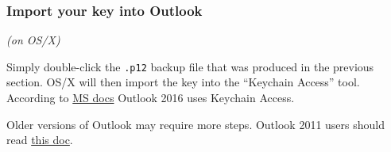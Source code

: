 \documentclass[pdftex,12pt,titlepage=false]{scrartcl}
\begin{document}
\subsubsection{Import your key into Outlook}\label{import}
\begin{minipage}[t]{0.47\textwidth}
  \centerline{\textsl{(on OS/X)}} Simply double-click the
  \texttt{.p12} backup file that was produced in the previous section.
  OS/X will then import the key into the ``Keychain Access'' tool.
  According to
  \href{https://technet.microsoft.com/en-us/library/jj984223(v=office.16).aspx}{MS
    docs} Outlook 2016 uses Keychain Access.

  Older versions of Outlook may require more steps.  Outlook 2011
  users should read
  \href{https://support.microsoft.com/en-us/help/2957671/you-cannot-manage-your-certificates-in-the-mac-os-x-10-9-keychain}{%
    this doc}.
\end{minipage}\hfill%
\end{document}
